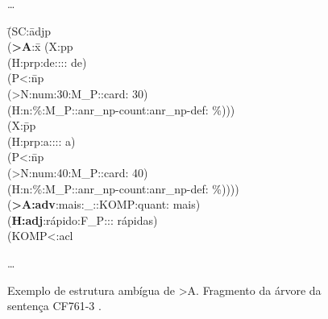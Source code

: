 \begin{figure}[!h]
    \centering
    \begin{minipage}{10cm}
        \ldots
        \begin{tabbing}
            \=(SC:\=adjp \+\\
            \>    (\textbf{>A}:\=x (X:pp\+\\ 
            \>          (H:prp:de:::: de)\\
            \>          (P<:\=np \+\\
            \>            (>N:num:30:M\_P::card: 30)\\
            \>            (H:n:\%:M\_P::anr\_np-count:anr\_np-def: \%)))\-\\
            \>        (X:\=pp \+\\
            \>          (H:prp:a:::: a)\\
            \>          (P<:\=np \+\\
            \>            (>N:num:40:M\_P::card: 40)\\
            \>            (H:n:\%:M\_P::anr\_np-count:anr\_np-def: \%))))\-\-\-\\
            \>    (\textbf{>A:adv}:mais:\_::KOMP:quant: mais)\\
            \>    (\textbf{H:adj}:rápido:F\_P::: rápidas)\\
            \>    (KOMP<:acl \\
        \end{tabbing}
        \ldots
    \end{minipage}
    \caption[Exemplo de estrutura ambígua de >A]{Exemplo de estrutura ambígua de >A. Fragmento da árvore da sentença CF761-3 .}
    \label{fig:bosque_a_seta_errado}
\end{figure}
